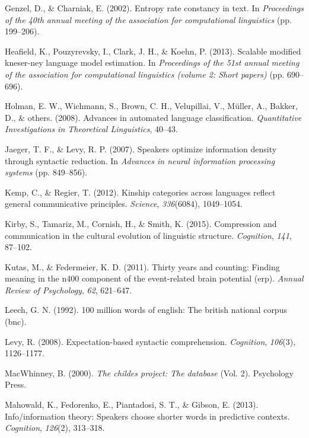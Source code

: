 \documentclass[
  english,
  man,floatsintext]{apa6}
\newlength{\cslhangindent}
\newenvironment{cslreferences}%
  {\setlength{\parindent}{0pt}%
  \everypar{\setlength{\hangindent}{\cslhangindent}}\ignorespaces}%
  {\par}
\begin{document}
\begin{cslreferences}
\leavevmode\hypertarget{ref-genzel2002}{}%
Genzel, D., \& Charniak, E. (2002). Entropy rate constancy in text. In \emph{Proceedings of the 40th annual meeting of the association for computational linguistics} (pp. 199--206).

\leavevmode\hypertarget{ref-heafield2013}{}%
Heafield, K., Pouzyrevsky, I., Clark, J. H., \& Koehn, P. (2013). Scalable modified kneser-ney language model estimation. In \emph{Proceedings of the 51st annual meeting of the association for computational linguistics (volume 2: Short papers)} (pp. 690--696).

\leavevmode\hypertarget{ref-holman2008}{}%
Holman, E. W., Wichmann, S., Brown, C. H., Velupillai, V., Müller, A., Bakker, D., \& others. (2008). Advances in automated language classification. \emph{Quantitative Investigations in Theoretical Linguistics}, 40--43.

\leavevmode\hypertarget{ref-jaeger2007}{}%
Jaeger, T. F., \& Levy, R. P. (2007). Speakers optimize information density through syntactic reduction. In \emph{Advances in neural information processing systems} (pp. 849--856).

\leavevmode\hypertarget{ref-kemp2012kinship}{}%
Kemp, C., \& Regier, T. (2012). Kinship categories across languages reflect general communicative principles. \emph{Science}, \emph{336}(6084), 1049--1054.

\leavevmode\hypertarget{ref-kirby2015compression}{}%
Kirby, S., Tamariz, M., Cornish, H., \& Smith, K. (2015). Compression and communication in the cultural evolution of linguistic structure. \emph{Cognition}, \emph{141}, 87--102.

\leavevmode\hypertarget{ref-kutas2011}{}%
Kutas, M., \& Federmeier, K. D. (2011). Thirty years and counting: Finding meaning in the n400 component of the event-related brain potential (erp). \emph{Annual Review of Psychology}, \emph{62}, 621--647.

\leavevmode\hypertarget{ref-leech1992}{}%
Leech, G. N. (1992). 100 million words of english: The british national corpus (bnc).

\leavevmode\hypertarget{ref-levy2008}{}%
Levy, R. (2008). Expectation-based syntactic comprehension. \emph{Cognition}, \emph{106}(3), 1126--1177.

\leavevmode\hypertarget{ref-macwhinney2000}{}%
MacWhinney, B. (2000). \emph{The childes project: The database} (Vol. 2). Psychology Press.

\leavevmode\hypertarget{ref-mahowald2013}{}%
Mahowald, K., Fedorenko, E., Piantadosi, S. T., \& Gibson, E. (2013). Info/information theory: Speakers choose shorter words in predictive contexts. \emph{Cognition}, \emph{126}(2), 313--318.


\end{cslreferences}
\end{document}

